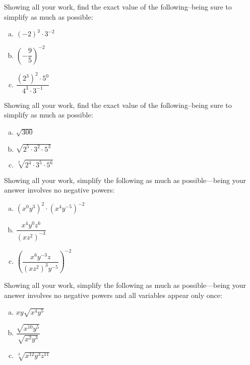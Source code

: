 \documentclass[11pt,letterpaper]{article}
\begin{document}

 Showing all your work, find the exact value of the following--being sure to simplify as much as possible:
	\begin{enumerate}[(a)]
	\item $(-2)^3 \cdot 3^{-2}$
	\item $\left( -\dfrac{9}{5} \right)^{-2}$
	\item $\dfrac{(2^3)^2 \cdot 5^0}{4^3 \cdot 3^{-1}}$
	\end{enumerate}



\newpage



 Showing all your work, find the exact value of the following--being sure to simplify as much as possible:
	\begin{enumerate}[(a)]
	\item $\sqrt{300}$
	\item $\sqrt{2^5 \cdot 3^2 \cdot 5^3}$
	\item $\sqrt[3]{2^{4} \cdot 3^5 \cdot 5^6}$
	\end{enumerate}



\newpage



 Showing all your work, simplify the following as much as possible---being your answer involves no negative powers:
	\begin{enumerate}[(a)]
	\item $(x^0 y^3)^2 \cdot (x^4 y^{-5})^{-2}$
	\item $\dfrac{x^{4} y^0 z^6}{(x z^2)^{-3}}$
	\item $\left( \dfrac{x^6 y^{-3} z}{(x z^2)^3 y^{-5}} \right)^{-2}$
	\end{enumerate}



\newpage



 Showing all your work, simplify the following as much as possible---being your answer involves no negative powers and all variables appear only once:
	\begin{enumerate}[(a)]
	\item $xy \sqrt{x^4 y^5}$
	\item $\dfrac{\sqrt{x^{10} y^5}}{\sqrt{x^2 y^3}}$
	\item $\sqrt[3]{x^{12} y^3 z^{11}}$
	\end{enumerate}
\end{document}
